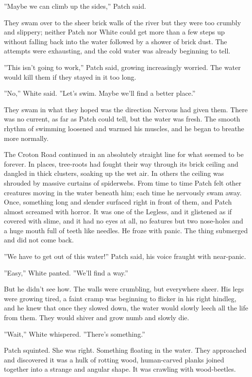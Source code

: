 \documentclass[11pt]{article}
\begin{document}
 ''Maybe we can climb up the sides,'' Patch said.\par
 They swam over to the sheer brick walls of the river %
 but they were too crumbly and slippery; neither Patch nor White could get more than a few steps up without falling back into the water followed by a shower of brick dust. The attempts were exhausting, and the cold water was already beginning to tell.\par
 ''This isn't going to work,'' Patch said, growing increasingly worried. The water would kill them if they stayed in it too long.\par
 ''No,'' White said. ''Let's swim. Maybe we'll find a better place.''\par
 They swam in what they hoped was the direction Nervous had given them. There was no current, as far as Patch could tell, but the water was fresh. The smooth rhythm of swimming loosened and warmed his muscles, and he began to breathe more normally.\par
 The Croton Road continued in an absolutely straight line for what seemed to be forever. In places, tree-roots had fought their way through its brick ceiling and dangled in thick clusters, soaking up the wet air. In others the ceiling was shrouded by massive curtains of spiderwebs. From time to time Patch felt other creatures moving in the water beneath him; each time he nervously swam away. Once, something long and slender surfaced right in front of them, and Patch almost screamed with horror. It was one of the Legless, and it glistened as if covered with slime, and it had no eyes at all, no features but two nose-holes and a huge mouth full of teeth like needles. He froze with panic. The thing submerged and did not come back.\par
 ''We have to get out of this water!'' Patch said, his voice fraught with near-panic.\par
 ''Easy,'' White panted. ''We'll find a way.''\par
 But he didn't see how. The walls were crumbling, but everywhere sheer. His legs were growing tired, a faint cramp was beginning to flicker in his right hindleg, and he knew that once they slowed down, the water would slowly leech all the life from them. They would shiver and grow numb and slowly die.\par
 ''Wait,'' White whispered. ''There's something.''\par
 Patch squinted. She was right. Something floating in the water. They approached and discovered it was a hulk of rotting wood, human-carved planks joined together into a strange and angular shape. It was crawling with wood-beetles.\par
\end{document}
